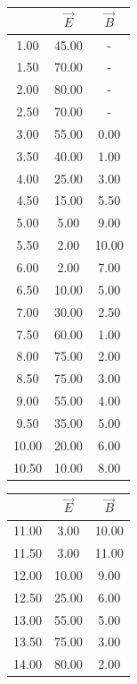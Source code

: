 \documentclass[a4paper,11pt]{article}
\begin{document}
\FloatBarrier
\begin{flushleft}


\begin{table}[!htp]

		\begin{tabular}{|c|c|c|} \hline 
			\backslashbox{Dist.(cm) }{Campo  $ (\mu A)$}  & $ \vec{E} $ & $ \vec{B} $ \\ \hline
		 1.00 & 45.00 & - \\ \hline 
		 1.50 & 70.00 & - \\ \hline 
		 2.00 & 80.00 & - \\ \hline 
		 2.50 & 70.00 & - \\ \hline 
		 3.00 & 55.00 & 0.00 \\ \hline 
		 3.50 & 40.00 & 1.00 \\ \hline 
		 4.00 & 25.00 & 3.00 \\ \hline 
		 4.50 & 15.00 & 5.50 \\ \hline 
		 5.00 & 5.00 & 9.00 \\ \hline 
		 5.50 & 2.00 & 10.00 \\ \hline 
		 6.00 & 2.00 & 7.00 \\ \hline 
		 6.50 & 10.00 & 5.00 \\ \hline 
		 7.00 & 30.00 & 2.50 \\ \hline 
		 7.50 & 60.00 & 1.00 \\ \hline 
		 8.00 & 75.00 & 2.00 \\ \hline 
		 8.50 & 75.00 & 3.00 \\ \hline 
		 9.00 & 55.00 & 4.00 \\ \hline 
		 9.50 & 35.00 & 5.00 \\ \hline 
		 10.00 & 20.00 & 6.00 \\ \hline 
		 10.50 & 10.00 & 8.00 \\ \hline 
		\end{tabular}
	\begin{tabular}{|c|c|c|} \hline
	\backslashbox{Dist.(cm) }{Campo  $ (\mu A) $}  & $ \vec{E} $ & $ \vec{B} $ \\ \hline
		 11.00 & 3.00 & 10.00 \\ \hline 
		 11.50 & 3.00 & 11.00 \\ \hline 
		 12.00 & 10.00 & 9.00 \\ \hline 
		 12.50 & 25.00 & 6.00 \\ \hline 
		 13.00 & 55.00 & 5.00 \\ \hline 
		 13.50 & 75.00 & 3.00 \\ \hline 
		 14.00 & 80.00 & 2.00 \\ \hline 

\end{tabular}
\end{table}
\end{flushleft}
\end{document}
